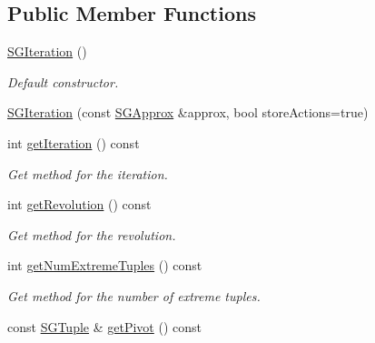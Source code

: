 \subsection*{Public Member Functions}
\begin{DoxyCompactItemize}
\item 
\mbox{\label{classSGIteration_aa47645b3a728b2ca55ad2e7d17c5c488}} 
\hyperlink{classSGIteration_aa47645b3a728b2ca55ad2e7d17c5c488}{S\+G\+Iteration} ()
\begin{DoxyCompactList}\small\item\em Default constructor. \end{DoxyCompactList}\item 
\hyperlink{classSGIteration_a4ac425cc85882c11443ef43601efd80b}{S\+G\+Iteration} (const \hyperlink{classSGApprox}{S\+G\+Approx} \&approx, bool store\+Actions=true)
\item 
\mbox{\label{classSGIteration_a84d8aaef35b4a93f555cf1e0d8e5b964}} 
int \hyperlink{classSGIteration_a84d8aaef35b4a93f555cf1e0d8e5b964}{get\+Iteration} () const
\begin{DoxyCompactList}\small\item\em Get method for the iteration. \end{DoxyCompactList}\item 
\mbox{\label{classSGIteration_af8b2fc2937e7c81248009904ffd0c14b}} 
int \hyperlink{classSGIteration_af8b2fc2937e7c81248009904ffd0c14b}{get\+Revolution} () const
\begin{DoxyCompactList}\small\item\em Get method for the revolution. \end{DoxyCompactList}\item 
\mbox{\label{classSGIteration_afd87a05e0df65e9361044f5cef1c5cc6}} 
int \hyperlink{classSGIteration_afd87a05e0df65e9361044f5cef1c5cc6}{get\+Num\+Extreme\+Tuples} () const
\begin{DoxyCompactList}\small\item\em Get method for the number of extreme tuples. \end{DoxyCompactList}\item 
\mbox{\label{classSGIteration_a4a9c13016c8f6ffd0238e95c0076011c}} 
const \hyperlink{classSGTuple}{S\+G\+Tuple} \& \hyperlink{classSGIteration_a4a9c13016c8f6ffd0238e95c0076011c}{get\+Pivot} () const

\end{DoxyCompactItemize}
